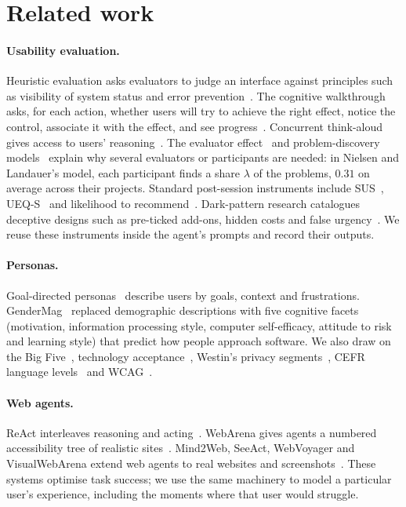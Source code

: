 \documentclass[10pt,twocolumn]{article}
\begin{document}
\section{Related work}
\label{sec:related}

\paragraph{Usability evaluation.} Heuristic evaluation asks evaluators to judge an interface against principles such as visibility of system status and error prevention~\cite{nielsen1990heuristic,nielsen1994heuristic}. The cognitive walkthrough asks, for each action, whether users will try to achieve the right effect, notice the control, associate it with the effect, and see progress~\cite{polson1992cognitive,wharton1994cognitive}. Concurrent think-aloud gives access to users' reasoning~\cite{ericsson1993protocol}. The evaluator effect~\cite{hertzum2001evaluator,molich2008cue4} and problem-discovery models~\cite{nielsen1993mathematical,virzi1992refining} explain why several evaluators or participants are needed: in Nielsen and Landauer's model, each participant finds a share $\lambda$ of the problems, $0.31$ on average across their projects. Standard post-session instruments include SUS~\cite{brooke1996sus,bangor2009determining,sauro2016quantifying}, UEQ-S~\cite{schrepp2017ueqs} and likelihood to recommend~\cite{reichheld2003one}. Dark-pattern research catalogues deceptive designs such as pre-ticked add-ons, hidden costs and false urgency~\cite{gray2018dark,mathur2019dark}. We reuse these instruments inside the agent's prompts and record their outputs.

\paragraph{Personas.} Goal-directed personas~\cite{cooper1999inmates,pruitt2003personas} describe users by goals, context and frustrations. GenderMag~\cite{burnett2016gendermag} replaced demographic descriptions with five cognitive facets (motivation, information processing style, computer self-efficacy, attitude to risk and learning style) that predict how people approach software. We also draw on the Big Five~\cite{john1999big}, technology acceptance~\cite{davis1989perceived}, Westin's privacy segments~\cite{kumaraguru2005privacy}, CEFR language levels~\cite{coe2001cefr} and WCAG~\cite{w3c2023wcag,w3c2017stories}.

\paragraph{Web agents.} ReAct interleaves reasoning and acting~\cite{yao2023react}. WebArena gives agents a numbered accessibility tree of realistic sites~\cite{zhou2024webarena}. Mind2Web, SeeAct, WebVoyager and VisualWebArena extend web agents to real websites and screenshots~\cite{deng2023mind2web,zheng2024seeact,he2024webvoyager,koh2024visualwebarena}. These systems optimise task success; we use the same machinery to model a particular user's experience, including the moments where that user would struggle.
\end{document}
